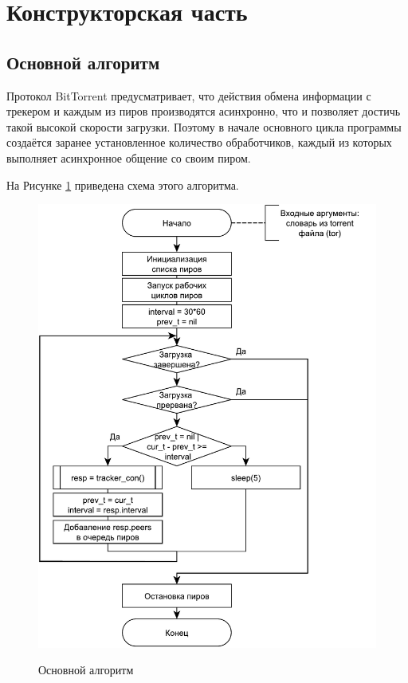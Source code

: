 \section{Конструкторская часть}

\subsection{Основной алгоритм}
Протокол BitTorrent предусматривает, что действия обмена информации с трекером и каждым из пиров производятся асинхронно, что и позволяет достичь такой высокой скорости загрузки. Поэтому в начале основного цикла программы создаётся заранее установленное количество обработчиков, каждый из которых выполняет асинхронное общение со своим пиром.

На Рисунке \ref{fig200:image} приведена схема этого алгоритма.
\begin{figure}[h]
	\begin{center}
		{\includegraphics[scale = 0.68]{img/main.pdf}}
		\caption{Основной алгоритм}
		\label{fig200:image}
	\end{center}
\end{figure}

